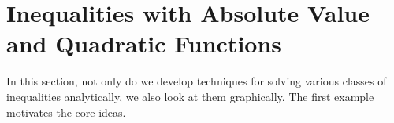 \section{Inequalities with Absolute Value and Quadratic Functions}
\label{Inequalities}

In this section, not only do we develop techniques for solving various classes of inequalities analytically, we also look at them graphically.  The first example motivates the core ideas.

\medskip

